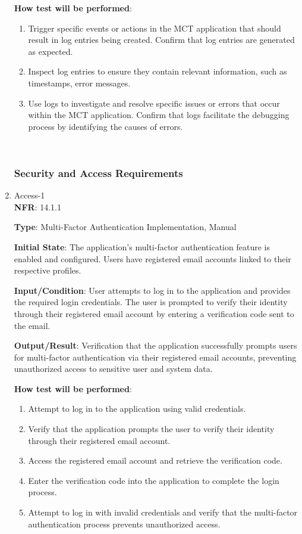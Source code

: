 \documentclass[12pt, titlepage]{article}
\begin{document}
\begin{enumerate}
\textbf{How test will be performed}: 
\begin{enumerate}
    \item Trigger specific events or actions in the MCT application that should result in log entries being created. Confirm that log entries are generated as expected. 
    \item Inspect log entries to ensure they contain relevant information, such as timestamps, error messages.
    \item Use logs to investigate and resolve specific issues or errors that occur within the MCT application. Confirm that logs facilitate the debugging process by identifying the causes of errors.
\end{enumerate}

\\

\subsubsection{Security and Access Requirements}
\item {Access-1\\}
\textbf{NFR}: 14.1.1

\textbf{Type}: Multi-Factor Authentication Implementation, Manual

\textbf{Initial State}: The application's multi-factor authentication feature is enabled and configured. Users have registered email accounts linked to their respective profiles.

\textbf{Input/Condition}:  User attempts to log in to the application and provides the required login credentials. The user is prompted to verify their identity through their registered email account by entering a verification code sent to the email.

\textbf{Output/Result}: Verification that the application successfully prompts users for multi-factor authentication via their registered email accounts, preventing unauthorized access to sensitive user and system data.

\textbf{How test will be performed}: 
\begin{enumerate}
    \item Attempt to log in to the application using valid credentials.
    \item Verify that the application prompts the user to verify their identity through their registered email account.
    \item Access the registered email account and retrieve the verification code.
    \item Enter the verification code into the application to complete the login process.
    \item Attempt to log in with invalid credentials and verify that the multi-factor authentication process prevents unauthorized access.


\end{enumerate}
\end{enumerate}
\end{document}
